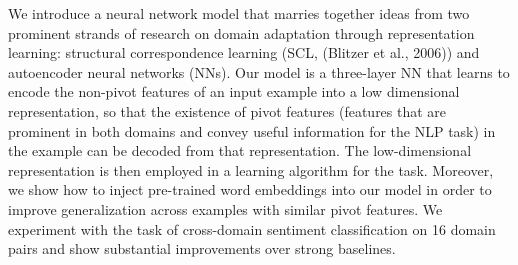 We introduce a neural network model that marries together ideas from two prominent strands of research on domain adaptation through representation learning: structural correspondence learning (SCL, (Blitzer et al., 2006)) and autoencoder neural networks (NNs). Our model is a three-layer NN that learns to encode the non-pivot features of an input example into a low dimensional representation, so that the existence of pivot features (features that are prominent in both domains and convey useful information for the NLP task) in the example can be decoded from that representation. The low-dimensional representation is then employed in a learning algorithm for the task. Moreover, we show how to inject pre-trained word embeddings into our model in order to improve generalization across examples with similar pivot features. We experiment with the task of cross-domain sentiment classification on 16 domain pairs and show substantial improvements over strong baselines.
